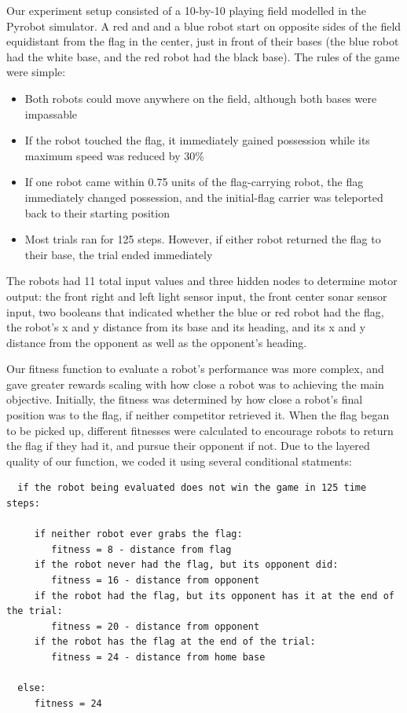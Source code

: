 \documentclass[11pt]{article}
\begin{document}
Our experiment setup consisted of a 10-by-10 playing field modelled in the Pyrobot simulator. A red and and a blue robot start on opposite sides of the field equidistant from the flag in the center, just in front of their bases (the blue robot had the white base, and the red robot had the black base). The rules of the game were simple:
\begin{itemize}
  \item Both robots could move anywhere on the field, although both bases were impassable
  \item If the robot touched the flag, it immediately gained possession while its maximum speed was reduced by 30\%
  \item If one robot came within 0.75 units of the flag-carrying robot, the flag immediately changed possession, and the initial-flag carrier was teleported back to their starting position
  \item Most trials ran for 125 steps. However, if either robot returned the flag to their base, the trial ended immediately
\end{itemize}

The robots had 11 total input values and three hidden nodes to determine motor output: the front right and left light sensor input, the front center sonar sensor input, two booleans that indicated whether the blue or red robot had the flag, the robot's x and y distance from its base and its heading, and  its x and y distance from the opponent as well as the opponent's heading.

Our fitness function to evaluate a robot's performance was more complex, and gave greater rewards scaling with how close a robot was to achieving the main objective. Initially, the fitness was determined by how close a robot's final position was to the flag, if neither competitor retrieved it. When the flag began to be picked up, different fitnesses were calculated to encourage robots to return the flag if they had it, and pursue their opponent if not. Due to the layered quality of our function, we coded it using several conditional statments:

\begin{verbatim}
  if the robot being evaluated does not win the game in 125 time steps:
 
     if neither robot ever grabs the flag:
        fitness = 8 - distance from flag
     if the robot never had the flag, but its opponent did:
        fitness = 16 - distance from opponent   
     if the robot had the flag, but its opponent has it at the end of the trial:
        fitness = 20 - distance from opponent  
     if the robot has the flag at the end of the trial:
        fitness = 24 - distance from home base
  
  else:
     fitness = 24
\end{verbatim}
\end{document}

